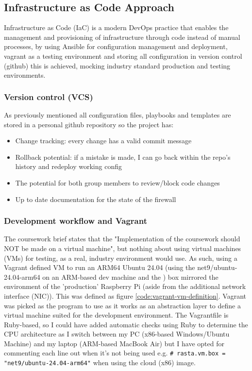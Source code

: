 \subsection{Infrastructure as Code Approach}
\label{sec:IaC}
Infrastructure as Code (IaC) is a modern DevOps practice that enables the management and provisioning of infrastructure through code instead of manual processes, \parencite[]{RedHat2024InfrastructureAsCode} by using Ansible \parencite[]{RedHat2024Ansible} for configuration management and deployment, vagrant as a testing environment and storing all configuration in version control (github) this is achieved, mocking industry standard production and testing environments.

\subsubsection{Version control (VCS)}
As previously mentioned all configuration files, playbooks and templates are stored in a personal github repository \parencite{ErcModel3_2024OperatingSystems} so the project has:
\begin{itemize}
    \item Change tracking: every change has a valid commit message
    \item Rollback potential: if a mistake is made, I can go back within the repo's history and redeploy working config
    \item The potential for both group members to review/block code changes
    \item Up to date documentation for the state of the firewall
\end{itemize}

\subsubsection{Development workflow and Vagrant}
The coursework brief states that the "Implementation of the coursework should NOT be made on a virtual machine", but nothing about using virtual machines (VMs) for testing, as a real, industry environment would use. As such, using a Vagrant \parencite[]{HashiCorp2024Vagrant} defined VM to run an ARM64 Ubuntu 24.04 (using the net9/ubuntu-24.04-arm64 on an ARM-based dev machine and the ) box mirrored the environment of the 'production' Raspberry Pi (aside from the additional network interface (NIC)). This was defined as figure \ref{code:vagrant-vm-definition}. Vagrant was picked as the program to use as it works as an abstraction layer to define a virtual machine suited for the development environment. The Vagrantfile is Ruby-based, so I could have added automatic checks using Ruby to determine the CPU architecture as I switch between my PC (x86-based Windows/Ubuntu Machine) and my laptop (ARM-based MacBook Air) but I have opted for commenting each line out when it's not being used e.g. \verb|# rasta.vm.box = "net9/ubuntu-24.04-arm64"| when using the cloud (x86) image.

